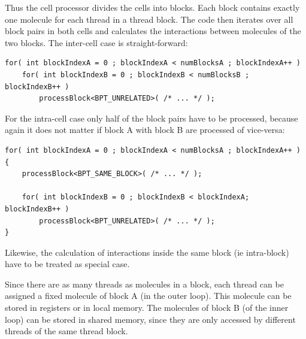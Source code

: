 Thus the cell processor divides the cells into blocks. Each block contains exactly one molecule for each thread in a thread block.
The code then iterates over all block pairs in both cells and calculates the interactions between molecules of the two blocks.
The inter-cell case is straight-forward:
\begin{lstlisting}[label=intercellloop,caption=inter-cell block processing (thread block cell processor)]
for( int blockIndexA = 0 ; blockIndexA < numBlocksA ; blockIndexA++ )
	for( int blockIndexB = 0 ; blockIndexB < numBlocksB ; blockIndexB++ )
		processBlock<BPT_UNRELATED>( /* ... */ );
\end{lstlisting}
For the intra-cell case only half of the block pairs have to be processed, because again it does not matter if block A with block B are processed of vice-versa:
\begin{lstlisting}[label=intracellloop,caption=intra-cell block processing (thread block cell processor)]
for( int blockIndexA = 0 ; blockIndexA < numBlocksA ; blockIndexA++ ) {
	processBlock<BPT_SAME_BLOCK>( /* ... */ );
	
	for( int blockIndexB = 0 ; blockIndexB < blockIndexA; blockIndexB++ )
		processBlock<BPT_UNRELATED>( /* ... */ );
}
\end{lstlisting}
Likewise, the calculation of interactions inside the same block (ie intra-block) have to be treated as special case.

Since there are as many threads as molecules in a block, each thread can be assigned a fixed molecule of block A (in the outer loop). This molecule can be stored in registers or in local memory.
The molecules of block B (of the inner loop) can be stored in shared memory, since they are only accessed by different threads of the same thread block.


